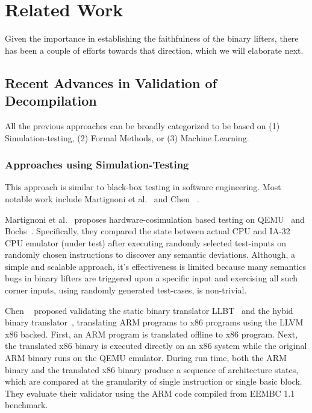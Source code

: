 \chapter{Related Work}\label{sec:related-work}

Given the importance in establishing the faithfulness of the binary lifters,
      there has been a couple of efforts towards that direction, which we will elaborate next.

\section{Recent Advances in Validation of Decompilation}\label{sec:recent-advances}
All the previous approaches can be broadly categorized to be based on (1)
  Simulation-testing, (2) Formal Methods, or (3) Machine Learning.  

\subsection{Approaches using Simulation-Testing}
This approach is similar to black-box testing in software engineering. Most
notable work include Martignoni et
al.~\cite{Martignoni:ISSTA2009, Martignoni:ISSTA2010,Martignoni:ASPLOS2012} and
Chen \etal~\cite{CLSS2015}.


Martignoni et al.~\cite{Martignoni:ISSTA2009, Martignoni:ISSTA2010} proposes
hardware-cosimulation based testing on QEMU~\cite{QEMU:USENIX05} and
Bochs~\cite{Bochs1996}.  Specifically, they compared the state between actual
CPU and  IA-32 CPU emulator (under test) after executing randomly selected
test-inputs on randomly chosen instructions  to discover any semantic
deviations.
Although, a simple and scalable approach, it's effectiveness is limited because
many semantics bugs in binary lifters are triggered upon a specific input and
exercising all such corner inputs, using randomly generated test-cases, is
non-trivial.

Chen \etal~\cite{CLSS2015} proposed validating the static binary translator
LLBT~\cite{LLBT2012} and the hybid binary translator~\cite{LLVMDBT2012},
  translating ARM programs to x86 programs using the LLVM x86 backed. First, an
  ARM program is translated offline to x86 program. Next, the translated x86
  binary is executed  directly on an x86 system while the original ARM binary runs on the QEMU emulator. During run time, both the ARM binary and the
  translated x86 binary produce a sequence of  architecture states, which are
  compared at the granularity of single instruction or single basic block. They evaluate their validator using the ARM code compiled from
  EEMBC 1.1 benchmark. 

